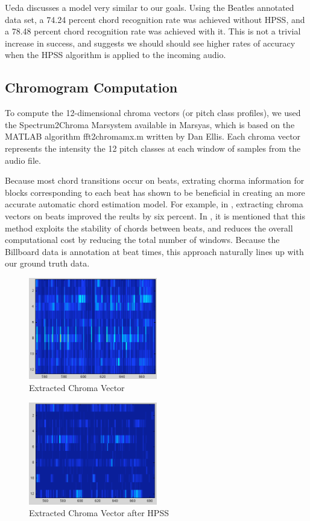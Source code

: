 \documentclass{article}
\begin{document}
Ueda \cite{Ueda:19} discusses a model very similar to our goals. Using the Beatles
annotated data set, a 74.24 percent chord recognition rate was achieved without HPSS, and
a 78.48 percent chord recognition rate was achieved with it. This is not a trivial increase in
success, and suggests we should should see higher rates of accuracy when the
HPSS algorithm is applied to the incoming audio.

\subsection{Chromogram Computation}

To compute the 12-dimensional chroma vectors (or pitch class profiles), we used the
Spectrum2Chroma Marsystem available in Marsyas, which is based on the MATLAB algorithm
fft2chromamx.m written by Dan Ellis.
Each chroma vector represents the intensity the 12 pitch classes at each window of
samples from the audio file.

Because most chord transitions occur on beats, extrating chorma information for blocks corresponding
to each beat has shown to be beneficial in creating an more accurate automatic chord
estimation model. For example, in \cite{Zenz:20}, extracting chroma vectors on beats improved
the reults by six percent. In \cite{McVicor:00}, it is mentioned that this method exploits the stability
of chords between beats, and reduces the overall computational cost by reducing the total
number of windows. Because the Billboard data is annotation at beat times, this approach naturally
lines up with our ground truth data.

\begin{figure}
   \centering
    \includegraphics[width=0.5\textwidth]{187.png}
   \caption{Extracted Chroma Vector}
   \label{fig:Chroma}
\end{figure}

\begin{figure}
   \centering
    \includegraphics[width=0.5\textwidth]{187h.png}
   \caption{Extracted Chroma Vector after HPSS}
   \label{fig:ChromaHPSS}
\end{figure}
\end{document}
